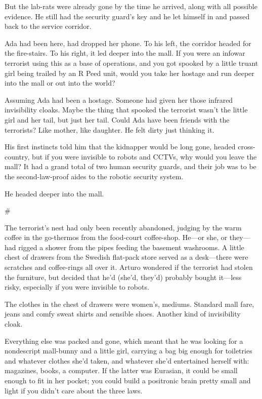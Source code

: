 But the lab-rats were already gone by the time he arrived, along
with all possible evidence. He still had the security guard’s key
and he let himself in and passed back to the service corridor.

Ada had been here, had dropped her phone. To his left, the corridor
headed for the fire-stairs. To his right, it led deeper into the
mall. If you were an infowar terrorist using this as a base of
operations, and you got spooked by a little truant girl being
trailed by an R Peed unit, would you take her hostage and run
deeper into the mall or out into the world?

Assuming Ada had been a hostage. Someone had given her those
infrared invisibility cloaks. Maybe the thing that spooked the
terrorist wasn’t the little girl and her tail, but just her tail.
Could Ada have been friends with the terrorists? Like mother, like
daughter. He felt dirty just thinking it.

His first instincts told him that the kidnapper would be long gone,
headed cross-country, but if you were invisible to robots and
CCTVs, why would you leave the mall? It had a grand total of two
human security guards, and their job was to be the second-law-proof
aides to the robotic security system.

He headed deeper into the mall.

\#

The terrorist’s nest had only been recently abandoned, judging by
the warm coffee in the go-thermos from the food-court coffee-shop.
He—or she, or they—had rigged a shower from the pipes feeding the
basement washrooms. A little chest of drawers from the Swedish
flat-pack store served as a desk—there were scratches and
coffee-rings all over it. Arturo wondered if the terrorist had
stolen the furniture, but decided that he’d (she’d, they’d)
probably bought it—less risky, especially if you were invisible to
robots.

The clothes in the chest of drawers were women’s, mediums. Standard
mall fare, jeans and comfy sweat shirts and sensible shoes. Another
kind of invisibility cloak.

Everything else was packed and gone, which meant that he was
looking for a nondescript mall-bunny and a little girl, carrying a
bag big enough for toiletries and whatever clothes she’d taken, and
whatever she’d entertained herself with: magazines, books, a
computer. If the latter was Eurasian, it could be small enough to
fit in her pocket; you could build a positronic brain pretty small
and light if you didn’t care about the three laws.

